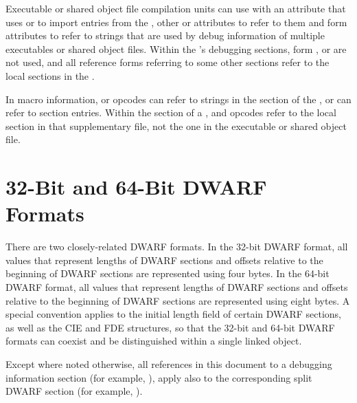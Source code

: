 Executable or shared object file compilation units can use
\DWTAGimportedunit{} with 
\bb
an \DWATimport{} attribute that uses \DWFORMrefsupfour{} or \DWFORMrefsupeight{} 
\eb
to import entries from the , other 
\bb
\DWFORMrefsupfour{} or \DWFORMrefsupeight{}
\eb
attributes to refer to them and \DWFORMstrpsup{} form attributes to
refer to strings that are used by debug information of multiple
executables or shared object files.  Within the 's
debugging sections, form 
\bb
\DWFORMrefsupfour{}, \DWFORMrefsupeight{} 
\eb
or \DWFORMstrpsup{} are
not used, and all reference forms referring to some other sections
refer to the local sections in the .

In macro information, \DWMACROdefinesup{} or
\DWMACROundefsup{} opcodes can refer to strings in the 
\dotdebugstr{} section of the , 
or \DWMACROimportsup{} 
can refer to \dotdebugmacro{} section entries.  Within the 
\dotdebugmacro{} section of a , 
\DWMACROdefinestrp{} and \DWMACROundefstrp{}
opcodes refer to the local \dotdebugstr{} section in that
supplementary file, not the one in
the executable or shared object file.


\section{32-Bit and 64-Bit DWARF Formats}
\label{datarep:32bitand64bitdwarfformats}
\hypertarget{datarep:xxbitdwffmt}{}
There are two closely-related DWARF
formats. In the 32-bit DWARF
format, all values that represent lengths of DWARF sections
and offsets relative to the beginning of DWARF sections are
represented using four bytes. In the 64-bit DWARF format, all
values that represent lengths of DWARF sections and offsets
relative to the beginning of DWARF sections are represented
using eight bytes. A special convention applies to the initial
length field of certain DWARF sections, as well as the CIE and
FDE structures, so that the 32-bit and 64-bit DWARF formats
can coexist and be distinguished within a single linked object.

Except where noted otherwise, all references in this document
to a debugging information section (for example, \dotdebuginfo),
apply also to the corresponding split DWARF section (for example,
\dotdebuginfodwo).

